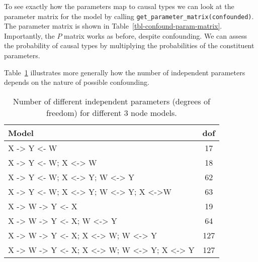 \documentclass[
  11pt,
  article]{jss}
\begin{document}
To see exactly how the parameters map to causal types we can look at the
parameter matrix for the model by calling
\texttt{get\_parameter\_matrix(confounded)}. The parameter matrix is
shown in Table~\ref{tbl-confound-param-matrix}. Importantly, the \(P\)
matrix works as before, despite confounding. We can assess the
probability of causal types by multiplying the probabilities of the
constituent parameters.

\hypertarget{tbl-confound-param-matrix}{}
\begin{table}
\caption{\label{tbl-confound-param-matrix}Parameter matrix for model with confounding. }\tabularnewline

\centering
{}
\end{table}

Table~\ref{tbl-dof} illustrates more generally how the number of
independent parameters depends on the nature of possible confounding.

\hypertarget{tbl-dof}{}
\begin{table}
\caption{\label{tbl-dof}Number of different independent parameters (degrees of freedom) for
different 3 node models. }\tabularnewline

\centering
\begin{tabular}{lc}
\toprule
Model & dof\\
\midrule
X -> Y <- W & 17\\
X -> Y <- W; X <-> W & 18\\
X -> Y <- W; X <-> Y; W <-> Y & 62\\
X -> Y <- W; X <-> Y; W <-> Y; X <->W & 63\\
X -> W -> Y <- X & 19\\
X -> W -> Y <- X; W <-> Y & 64\\
X -> W -> Y <- X; X <-> W; W <-> Y & 127\\
X -> W -> Y <- X; X <-> W; W <-> Y; X <-> Y & 127\\
\bottomrule
\end{tabular}
\end{table}
\end{document}
